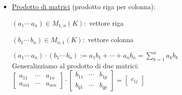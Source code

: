 \documentclass{article}
\newcommand{\ul}[1]{\underline{#1}}
\newcommand{\K}{\mathbb{K}}
\begin{document}
{\begin{itemize}
		      \ul{Proprietà}:
		      \begin{enumerate}
			      \item $+$ è commutativa: $A+B=B+A$
			      \item $+$ è associativa: $(A+B)+C=A+(B+C)$
			      \item Elemento neutro rispetto a $+$:\\
			            $0_{m,n}=\begin{bmatrix}0&\cdots&0\quad\vdots\quad0&\cdots&0\end{bmatrix}$
			      \item Elemento opposto rispetto a $+$:\\
			            $A=(a_{ij})\Rightarrow-A=(-a_{ij})$
			      \item $\lambda\cdot(A+B)=\lambda\cdot A + \lambda\cdot B$
			      \item $(\lambda+\mu)\cdot A=\lambda\cdot A+\mu\cdot A$
			      \item $(\lambda\mu)\cdot A=\lambda\cdot(\mu\cdot A)$
			      \item $1\cdot A = A\forall m,n\ge1\text{ interi, }(M_{m,n}(K),+,\cdot)\text{ è uno spazio vettoriale su }\K$
		      \end{enumerate}
		\item \ul{Prodotto di matrici} (prodotto riga per colonna):

		      $(a_1\cdots\ a_n)\in M_{1,n}(K):$ vettore riga

		      $(b_1\cdots\ b_n)\in M_{n,1}(K):$ vettore colonna

		      $(a_1\cdots\ a_n)\cdot(b_1\cdots\ b_n):=a_1b_1+\cdots+a_nb_n=\sum^n_{k=1}{a_kb_k}$\\

		      Generalizziamo al prodotto di due matrici:\\

		      $\begin{bmatrix}
				      a_{11} & \cdots & a_{1n} \\
				      a_{m1} & \cdots & a_{mn}
			      \end{bmatrix}
			      \cdot
			      \begin{bmatrix}
				      b_{11} & \cdots & b_{1p} \\
				      b_{q1} & \cdots & b_{qp}
			      \end{bmatrix}=
			      \begin{bmatrix}
				      c_{ij}
			      \end{bmatrix}$


\end{itemize}}
\end{document}
